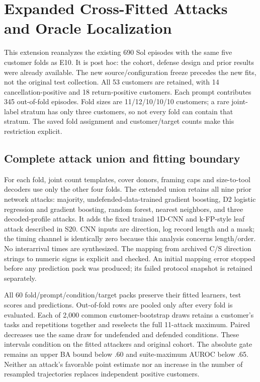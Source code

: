 \section{Expanded Cross-Fitted Attacks and Oracle Localization}\label{sec:r7-crossfit-supp}
This extension reanalyzes the existing 690 Sol episodes with the same five customer folds as E10. It is post hoc: the cohort, defense design and prior results were already available. The new source/configuration freeze precedes the new fits, not the original test collection. All 53 customers are retained, with 14 cancellation-positive and 18 return-positive customers. Each prompt contributes 345 out-of-fold episodes. Fold sizes are 11/12/10/10/10 customers; a rare joint-label stratum has only three customers, so not every fold can contain that stratum. The saved fold assignment and customer/target counts make this restriction explicit.

\subsection{Complete attack union and fitting boundary}
For each fold, joint count templates, cover donors, framing caps and size-to-tool decoders use only the other four folds. The extended union retains all nine prior network attacks: majority, undefended-data-trained gradient boosting, D2 logistic regression and gradient boosting, random forest, nearest neighbors, and three decoded-profile attacks. It adds the fixed trained 1D-CNN and k-FP-style leaf attack described in S20. CNN inputs are direction, log record length and a mask; the timing channel is identically zero because this analysis concerns length/order. No interarrival times are synthesized. The mapping from archived C/S direction strings to numeric signs is explicit and checked. An initial mapping error stopped before any prediction pack was produced; its failed protocol snapshot is retained separately.

All 60 fold/prompt/condition/target packs preserve their fitted learners, test scores and predictions. Out-of-fold rows are pooled only after every fold is evaluated. Each of 2,000 common customer-bootstrap draws retains a customer's tasks and repetitions together and reselects the full 11-attack maximum. Paired decreases use the same draw for undefended and defended conditions. These intervals condition on the fitted attackers and original cohort. The absolute gate remains an upper BA bound below .60 and suite-maximum AUROC below .65. Neither an attack's favorable point estimate nor an increase in the number of resampled trajectories replaces independent positive customers.

